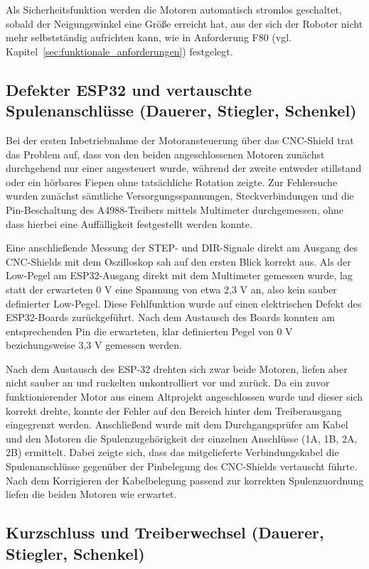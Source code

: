 \documentclass[fontsize=12pt,
parskip=half,	%
department=FakM,  %
logostyle=flat,
twoside, %
DIV=15,BCOR=10mm, %
]{OTHRreprt}
\begin{document}
Als Sicherheitsfunktion werden die Motoren automatisch stromlos geschaltet, sobald der Neigungswinkel eine Größe erreicht hat, aus der sich der Roboter nicht mehr selbstständig aufrichten kann, wie in Anforderung F80 (vgl. Kapitel~\ref{sec:funktionale_anforderungen}) festgelegt.

\subsection{Defekter ESP32 und vertauschte Spulenanschlüsse (Dauerer, Stiegler, Schenkel)}
\label{subsec:motor_problem_cncshield}

Bei der ersten In\-be\-trieb\-nah\-me der Mo\-tor\-an\-steue\-rung über das CNC-Shield trat das Problem auf, dass von den beiden angeschlossenen Motoren zunächst durchgehend nur einer angesteuert wurde, während der zweite entweder stillstand oder ein hörbares Fiepen ohne tatsächliche Rotation zeigte. Zur Fehlersuche wurden zunächst sämtliche Versorgungsspannungen, Steckverbindungen und die Pin-Beschaltung des A4988-Treibers mittels Multimeter durchgemessen, ohne dass hierbei eine Auffälligkeit festgestellt werden konnte.

Eine anschließende Messung der STEP- und DIR-Signale direkt am Ausgang des CNC-Shields mit dem Oszilloskop sah auf den ersten Blick korrekt aus. Als der Low-Pegel am ESP32-Ausgang direkt mit dem Multimeter gemessen wurde, lag statt der erwarteten 0 V eine Spannung von etwa 2,3 V an, also kein sauber definierter Low-Pegel. Diese Fehlfunktion wurde auf einen elektrischen Defekt des ESP32-Boards zurückgeführt. Nach dem Austausch des Boards konnten am entsprechenden Pin die erwarteten, klar definierten Pegel von 0 V beziehungsweise 3,3 V gemessen werden.

Nach dem Austausch des ESP-32 drehten sich zwar beide Motoren, liefen aber nicht sauber an und ruckelten unkontrolliert vor und zurück. Da ein zuvor funktionierender Motor aus einem Altprojekt angeschlossen wurde und dieser sich korrekt drehte, konnte der Fehler auf den Bereich hinter dem Treiberausgang eingegrenzt werden. Anschließend wurde mit dem Durchgangsprüfer am Kabel und den Motoren die Spulenzugehörigkeit der einzelnen Anschlüsse (1A, 1B, 2A, 2B) ermittelt. Dabei zeigte sich, dass das mitgelieferte Verbindungskabel die Spulenanschlüsse gegenüber der Pinbelegung des CNC-Shields vertauscht führte. Nach dem Korrigieren der Kabelbelegung passend zur korrekten Spulenzuordnung liefen die beiden Motoren wie erwartet.

\subsection{Kurzschluss und Treiberwechsel (Dauerer, Stiegler, Schenkel)}
\label{subsec:motor_kurzschluss}
\end{document}
